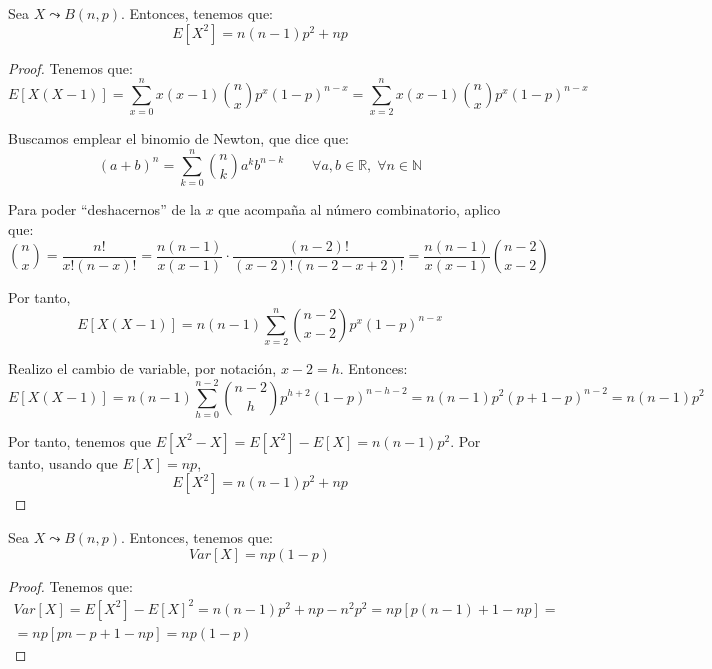\begin{lema}
    Sea $X\leadsto B(n,p)$. Entonces, tenemos que:
    \begin{equation*}
        E[X^2] = n(n-1)p^2+np
    \end{equation*}
\end{lema}
\begin{proof}
    Tenemos que:
    \begin{equation*}
        E[X(X-1)] = \sum_{x=0}^n x(x-1) \binom{n}{x}p^x (1-p)^{n-x} = \sum_{x=2}^n x(x-1)\binom{n}{x}p^x (1-p)^{n-x}
    \end{equation*}

    Buscamos emplear el binomio de Newton, que dice que:
    \begin{equation*}
        (a+b)^n = \sum_{k=0}^n \binom{n}{k} a^kb^{n-k} \qquad \forall a,b\in \mathbb{R}, \;\forall n\in \mathbb{N}
    \end{equation*}

    Para poder ``deshacernos'' de la $x$ que acompaña al número combinatorio, aplico que:
    \begin{equation*}
        \binom{n}{x} = \frac{n!}{x!(n-x)!} = \frac{n(n-1)}{x(x-1)}\cdot \frac{(n-2)!}{(x-2)!(n-2-x+2)!} = \frac{n(n-1)}{x(x-1)}\binom{n-2}{x-2}
    \end{equation*}

    Por tanto,
    \begin{equation*}
        E[X(X-1)] = n(n-1) \sum_{x=2}^n \binom{n-2}{x-2}p^x (1-p)^{n-x}
    \end{equation*}

    Realizo el cambio de variable, por notación, $x-2=h$. Entonces:
    \begin{equation*}
        E[X(X-1)] = n(n-1) \sum_{h=0}^{n-2} \binom{n-2}{h}p^{h+2} (1-p)^{n-h-2} = n(n-1)p^2(p+1-p)^{n-2} = n(n-1)p^2
    \end{equation*}

    Por tanto, tenemos que $E[X^2-X]=E[X^2]-E[X] = n(n-1)p^2$. Por tanto, usando que $E[X]=np$,
    \begin{equation*}
        E[X^2]=n(n-1)p^2+np
    \end{equation*}
    
\end{proof}

\begin{coro}
    Sea $X\leadsto B(n,p)$. Entonces, tenemos que:
    \begin{equation*}
        Var[X] = np(1-p)
    \end{equation*}
\end{coro}
\begin{proof}
    Tenemos que:
    \begin{multline*}
        Var[X] = E[X^2] - E[X]^2 = n(n-1)p^2 +np -n^2p^2 =np[p(n-1)+1-np] =\\= np[pn-p+1-np] = np(1-p)
    \end{multline*}
    
\end{proof}

